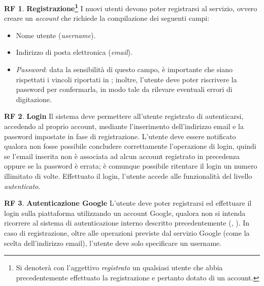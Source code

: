 \documentclass[11pt, a4paper]{article}
\theoremstyle{definition}
\newtheorem{funcreq}{RF} %
\begin{document}
\begin{funcreq}
\label{signup}
\textbf{Registrazione\footnote{Si denoterà con l'aggettivo \textit{registrato} un qualsiasi
utente che abbia precedentemente effettuato la registrazione e pertanto dotato di un account.} }
I nuovi utenti devono poter registrarsi al servizio, ovvero creare un \textit{account} che
richiede la compilazione dei seguenti campi:
\begin{itemize}
    \item Nome utente (\textit{username}).
    \item Indirizzo di posta elettronica (\textit{email}).
    \item \textit{Password}: data la sensibilità di questo campo, è importante
    che siano rispettati i vincoli riportati in \textcolor{blue}{};
    inoltre, l'utente deve poter riscrivere la password per confermarla, in
    modo tale da rilevare eventuali errori di digitazione.
\end{itemize}
\end{funcreq}

\begin{funcreq}
\label{login}
\textbf{Login }
Il sistema deve permettere all'utente registrato di autenticarsi,
accedendo al proprio account, mediante l'inserimento dell'indirizzo
email e la password impostate in fase di registrazione. L'utente deve
essere notificato qualora non fosse possibile concludere correttamente
l'operazione di login, quindi se l'email inserita non è associata ad alcun
account registrato in precedenza oppure se la password è errata;
è comunque possibile ritentare il login un numero illimitato di volte.
Effettuato il login, l'utente accede alle funzionalità del livello \textit{autenticato}.
\end{funcreq}

\begin{funcreq}
\label{google}
\textbf{Autenticazione Google }
L'utente deve poter registrarsi ed effettuare il login sulla piattaforma
utilizzando un account Google, qualora non si intenda ricorrere al sistema di
autenticazione interno descritto precedentemente (\textcolor{blue}{}, \textcolor{blue}{}).
In caso di registrazione, oltre alle operazioni previste dal servizio Google
(come la scelta dell'indirizzo email), l'utente deve solo specificare un username.
\end{funcreq}
\end{document}
